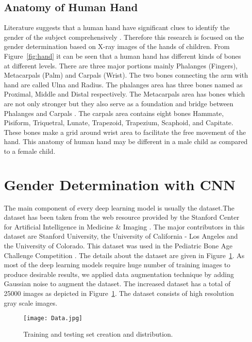 \documentclass{bioinfo}
\begin{document}
\subsection{Anatomy of Human Hand}
Literature suggests that a human hand have significant clues to identify the gender of the subject comprehensively \citep{david17}. Therefore this research is focused on the gender determination based on X-ray images of the hands of children. From Figure~\ref{fig:hand} it can be seen that a human hand has different kinds of bones at different levels. There are three major portions mainly Phalanges (Fingers), Metacarpals (Palm) and Carpals (Wrist). The two bones connecting the arm with hand  are called Ulna and Radius. The phalanges area has three bones named as Proximal, Middle and Distal respectively. The Metacarpals area has bones which are not only stronger but they also serve as a foundation and bridge between Phalanges and Carpals \citep{edwards13}. The carpals area contains eight bones Hammate, Pisiform, Triquetral, Lunate, Trapezoid, Trapezium, Scaphoid, and Capitate. These bones make a grid around wrist area to facilitate the free movement of the hand. This anatomy of human hand may be different in a male child as compared to a female child.

\section{Gender Determination with CNN}
The main component of every deep learning model is usually the dataset.The dataset has been taken from the web resource provided by the Stanford Center for Artificial Intelligence in Medicine \& Imaging \citep{david17}. The major contributors in this dataset are Stanford University, the University of California - Los Angeles and the University of Colorado. This dataset was used in the Pediatric Bone Age Challenge Competition \citep{david17}. The details about the dataset are given in Figure~\ref{fig:dataset}. As most of the deep learning models require huge number of training images to produce desirable results, we applied data augmentation technique by adding Gaussian noise \citep{rmzur09} to augment the dataset. The increased dataset has a total of 25000 images as depicted in Figure~\ref{fig:dataset}. The dataset consists of high resolution gray scale images.
\begin{figure}[h]%
\texttt{[image: Data.jpg]}
\caption{Training and testing set creation and distribution.}
\label{fig:dataset}
\end{figure}
\end{document}
